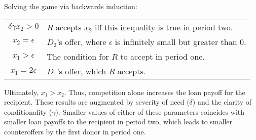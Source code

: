Solving the game via backwards induction:

\begin{center}
\begin{tabular}{c l}
    $\delta \gamma x_2 >0$ & $R$ accepts $x_2$ iff this inequality is true in period two. \\
    $x_2= \epsilon$ & $D_2$'s offer, where $\epsilon$ is infinitely small but greater than 0.\\
    $x_1>\epsilon$ & The condition for $R$ to accept in period one.\\
    $x_1=2 \epsilon$ & $D_1$'s offer, which $R$ accepts.\\
\end{tabular}
\end{center}

Ultimately, $x_1>x_2$. Thus, competition alone increases the loan payoff for the recipient. These results are augmented by severity of need ($\delta$) and the clarity of conditionality ($\gamma$). Smaller values of either of these parameters coincides with smaller loan payoffs to the recipient in period two, which leads to smaller counteroffers by the first donor in period one.